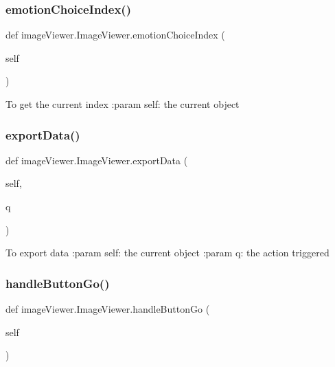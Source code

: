 \subsubsection{\texorpdfstring{emotion\+Choice\+Index()}{emotionChoiceIndex()}}
{\footnotesize\ttfamily def image\+Viewer.\+Image\+Viewer.\+emotion\+Choice\+Index (\begin{DoxyParamCaption}\item[{}]{self }\end{DoxyParamCaption})}

\begin{DoxyVerb}    To get the current index
    :param self: the current object
\end{DoxyVerb}
 \mbox{\label{classimage_viewer_1_1_image_viewer_ab3d7625a14c419a321861bd11d44cca9}} 
\subsubsection{\texorpdfstring{export\+Data()}{exportData()}}
{\footnotesize\ttfamily def image\+Viewer.\+Image\+Viewer.\+export\+Data (\begin{DoxyParamCaption}\item[{}]{self,  }\item[{}]{q }\end{DoxyParamCaption})}

\begin{DoxyVerb}    To export data
    :param self: the current object
    :param q: the action triggered
\end{DoxyVerb}
 \mbox{\label{classimage_viewer_1_1_image_viewer_a1108b9a6fc21bd740e613271fd8ac3a7}} 
\subsubsection{\texorpdfstring{handle\+Button\+Go()}{handleButtonGo()}}
{\footnotesize\ttfamily def image\+Viewer.\+Image\+Viewer.\+handle\+Button\+Go (\begin{DoxyParamCaption}\item[{}]{self }\end{DoxyParamCaption})}

